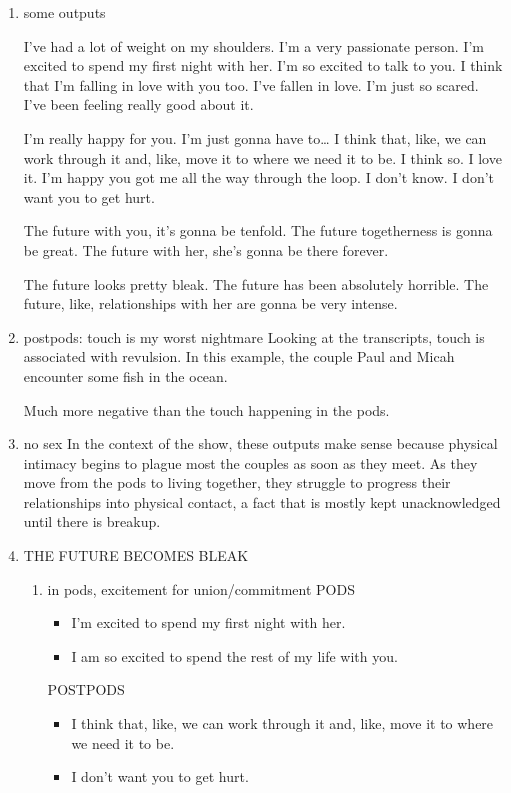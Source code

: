 \documentclass[11pt]{article}
\begin{document}
\begin{enumerate}
\item some outputs
\label{sec:org0ae33e2}

I've had a lot of weight on my shoulders.
I'm a very passionate person.
I'm excited to spend my first night with her.
I'm so excited to talk to you.
I think that I'm falling in love with you too.
I've fallen in love.
I'm just so scared.
I've been feeling really good about it.

I'm really happy for you.
I'm just gonna have to\ldots{}
I think that, like, we can work through it and, like, move it to where we need it to be.
I think so.
I love it.
I'm happy you got me all the way through the loop.
I don't know.
I don't want you to get hurt.

The future with you, it's gonna be tenfold.
The future togetherness is gonna be great.
The future with her, she's gonna be there forever.

The future looks pretty bleak.
The future has been absolutely horrible.
The future, like, relationships with her are gonna be very intense.
\item postpods: touch is my worst nightmare
\label{sec:org8d16dcc}
Looking at the transcripts, touch is associated with revulsion. In
this example, the couple Paul and Micah encounter some fish in the
ocean. 

Much more negative than the touch happening in the pods. 

\item no sex
\label{sec:org52125d8}
In the context of the show, these outputs make sense because physical
intimacy begins to plague most the couples as soon as they meet. As
they move from the pods to living together, they struggle to progress
their relationships into physical contact, a fact that is mostly kept
unacknowledged until there is breakup.
\item THE FUTURE BECOMES BLEAK
\label{sec:org5cdd622}
\begin{enumerate}
\item in pods, excitement for union/commitment
\label{sec:orgca84f9a}
PODS
\begin{itemize}
\item I'm excited to spend my first night with her.
\item I am so excited to spend the rest of my life with you.
\end{itemize}

POSTPODS
\begin{itemize}
\item I think that, like, we can work through it and, like, move it to
where we need it to be.
\item I don't want you to get hurt.
\end{itemize}


\end{enumerate}
\end{enumerate}
\end{document}
